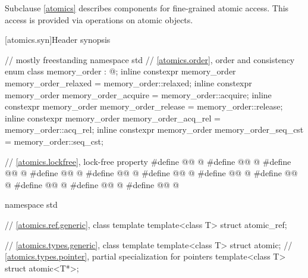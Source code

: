 \pnum
Subclause \ref{atomics} describes components for fine-grained atomic access.
This access is provided via operations on atomic objects.

[atomics.syn]{Header  synopsis}

%
\begin{codeblock}
// mostly freestanding
namespace std {
  // \ref{atomics.order}, order and consistency
  enum class memory_order : @\unspecnc@;
  inline constexpr memory_order memory_order_relaxed = memory_order::relaxed;
  inline constexpr memory_order memory_order_acquire = memory_order::acquire;
  inline constexpr memory_order memory_order_release = memory_order::release;
  inline constexpr memory_order memory_order_acq_rel = memory_order::acq_rel;
  inline constexpr memory_order memory_order_seq_cst = memory_order::seq_cst;
}

// \ref{atomics.lockfree}, lock-free property
#define @@ @\unspecnc@
#define @@ @\unspecnc@
#define @@ @\unspecnc@
#define @@ @\unspecnc@
#define @@ @\unspecnc@
#define @@ @\unspecnc@
#define @@ @\unspecnc@
#define @@ @\unspecnc@
#define @@ @\unspecnc@
#define @@ @\unspecnc@
#define @@ @\unspecnc@

namespace std {
  // \ref{atomics.ref.generic}, class template 
  template<class T> struct atomic_ref;

  // \ref{atomics.types.generic}, class template 
  template<class T> struct atomic;
  // \ref{atomics.types.pointer}, partial specialization for pointers
  template<class T> struct atomic<T*>;

}
\end{codeblock}
